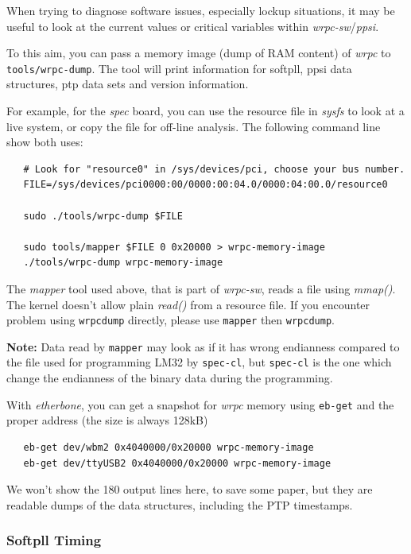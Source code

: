 \documentclass[a4paper, 12pt]{article}
\renewcommand{\_}{\underscore\allowbreak}
\begin{document}
When trying to diagnose software issues, especially lockup situations,
it may be useful to look at the current values or critical variables
within \textit{wrpc-sw}/\textit{ppsi}.

To this aim, you can pass a memory image (dump of RAM content) of \textit{wrpc} to 
\texttt{tools/wrpc-dump}.
The tool will print information for softpll, ppsi data structures,
ptp data sets and version information.

For example, for the \textit{spec} board, you can use the resource file in
\textit{sysfs} to look at a live system, or copy the file for off-line
analysis. The following command line show both uses:

\begin{lstlisting}
   # Look for "resource0" in /sys/devices/pci, choose your bus number.
   FILE=/sys/devices/pci0000:00/0000:00:04.0/0000:04:00.0/resource0

   sudo ./tools/wrpc-dump $FILE

   sudo tools/mapper $FILE 0 0x20000 > wrpc-memory-image
   ./tools/wrpc-dump wrpc-memory-image
\end{lstlisting}

The \textit{mapper} tool used above, that is part of \textit{wrpc-sw}, reads a file
using \textit{mmap()}. The kernel doesn't allow plain \textit{read()} from a
resource file. If you encounter problem using \texttt{wrpc\_dump} directly,
please use \texttt{mapper} then \texttt{wrpc\_dump}.

\textbf{Note:} Data read by \texttt{mapper} may look as if it has wrong endianness compared
to the file used for programming LM32 by \texttt{spec-cl}, but \texttt{spec-cl} is the
one which change the endianness of the binary data during the programming.

With \textit{etherbone}, you can get a snapshot for \textit{wrpc} memory using
\texttt{eb-get} and the proper address (the size is always 128kB)

\begin{lstlisting}
   eb-get dev/wbm2 0x4040000/0x20000 wrpc-memory-image
   eb-get dev/ttyUSB2 0x4040000/0x20000 wrpc-memory-image
\end{lstlisting}

We won't show the 180 output lines here, to save some paper, but they
are readable dumps of the data structures, including the PTP timestamps.

\subsubsection{Softpll Timing}
\label{spll Softpll Timing}
\end{document}
